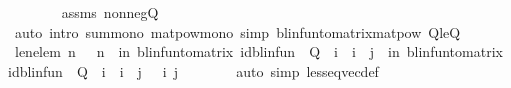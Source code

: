 \begin{isabellebody}
\ \ \ \ \ \ \isamarkupfalse%
\ assms\ nonneg{\isacharunderscore}{\kern0pt}Q\isanewline
\ \ \ \ \ \ \isamarkupfalse%
\ {\isacharparenleft}{\kern0pt}auto\ intro{\isacharbang}{\kern0pt}{\isacharcolon}{\kern0pt}\ sum{\isacharunderscore}{\kern0pt}mono\ matpow{\isacharunderscore}{\kern0pt}mono\ simp{\isacharcolon}{\kern0pt}\ blinfun{\isacharunderscore}{\kern0pt}to{\isacharunderscore}{\kern0pt}matrix{\isacharunderscore}{\kern0pt}matpow\ Q{}{\isacharunderscore}{\kern0pt}le{\isacharunderscore}{\kern0pt}Q{}{\isacharparenright}{\kern0pt}\isanewline
\ \ \ \ \isamarkupfalse%
\ le{\isacharunderscore}{\kern0pt}n{\isacharunderscore}{\kern0pt}elem{\isacharcolon}{\kern0pt}\ {\isachardoublequoteopen}{\isasymAnd}n{\isachardot}{\kern0pt}\ {}\ {\isasymle}\ n\ {\isasymLongrightarrow}\ {\isacharparenleft}{\kern0pt}{\isasymSum}i{\isacharless}{\kern0pt}n{\isachardot}{\kern0pt}\ blinfun{\isacharunderscore}{\kern0pt}to{\isacharunderscore}{\kern0pt}matrix\ {\isacharparenleft}{\kern0pt}{\isacharparenleft}{\kern0pt}id{\isacharunderscore}{\kern0pt}blinfun\ {\isacharminus}{\kern0pt}\ Q{}{\isacharparenright}{\kern0pt}\ {\isacharcircum}{\kern0pt}{\isacharcircum}{\kern0pt}\ i{\isacharparenright}{\kern0pt}{\isacharparenright}{\kern0pt}\ {\isachardollar}{\kern0pt}\ i\ {\isachardollar}{\kern0pt}\ j\ {\isasymle}\ {\isacharparenleft}{\kern0pt}{\isasymSum}i{\isacharless}{\kern0pt}n{\isachardot}{\kern0pt}\ blinfun{\isacharunderscore}{\kern0pt}to{\isacharunderscore}{\kern0pt}matrix\ {\isacharparenleft}{\kern0pt}{\isacharparenleft}{\kern0pt}id{\isacharunderscore}{\kern0pt}blinfun\ {\isacharminus}{\kern0pt}\ Q{}{\isacharparenright}{\kern0pt}\ {\isacharcircum}{\kern0pt}{\isacharcircum}{\kern0pt}\ i{\isacharparenright}{\kern0pt}{\isacharparenright}{\kern0pt}\ {\isachardollar}{\kern0pt}\ i\ {\isachardollar}{\kern0pt}\ j\ {\isachardoublequoteclose}\ \ i\ j\isanewline
\ \ \ \ \ \ \isamarkupfalse%
\ {\isacharparenleft}{\kern0pt}auto\ simp{\isacharcolon}{\kern0pt}\ less{\isacharunderscore}{\kern0pt}eq{\isacharunderscore}{\kern0pt}vec{\isacharunderscore}{\kern0pt}def{\isacharparenright}{\kern0pt}\isanewline
\ \ \ \ \isamarkupfalse%

\end{isabellebody}
